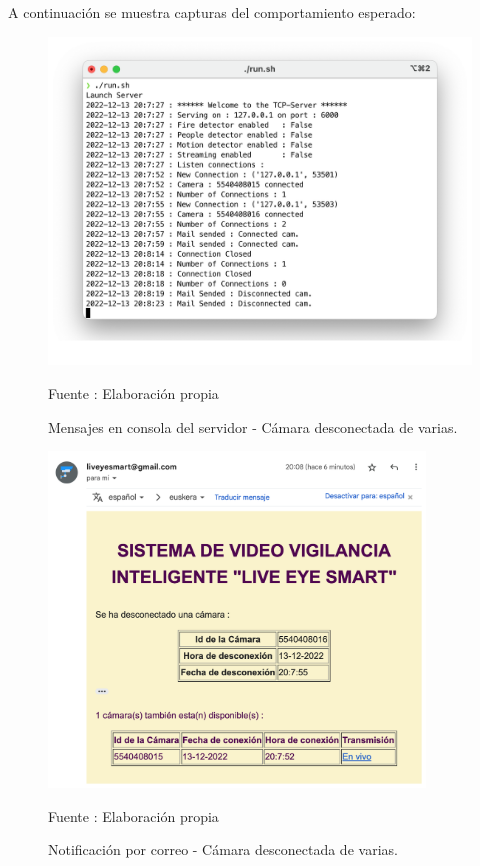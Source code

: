 A continuación se muestra capturas del comportamiento esperado:

\begin{figure}[H]
    \begin{center}
        \includegraphics[width=13cm]{img/capitulo_6/cam_disconnected_n_cams.png}
        \caption{Mensajes en consola del servidor - Cámara desconectada de varias.}
        Fuente : Elaboración propia
    \end{center}
\end{figure}

\begin{figure}[H]
    \begin{center}
        \includegraphics[width=10cm]{img/capitulo_6/mail3.png}
    \end{center}
    \begin{center}
        \caption{Notificación por correo - Cámara desconectada de varias.}
        Fuente : Elaboración propia
    \end{center}
\end{figure}

